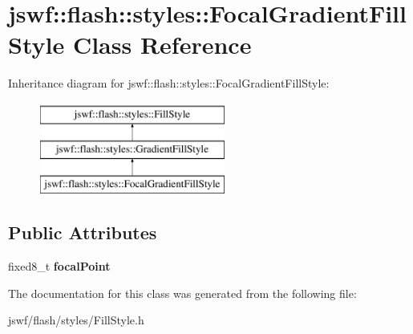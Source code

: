 \hypertarget{classjswf_1_1flash_1_1styles_1_1_focal_gradient_fill_style}{\section{jswf\+:\+:flash\+:\+:styles\+:\+:Focal\+Gradient\+Fill\+Style Class Reference}
\label{classjswf_1_1flash_1_1styles_1_1_focal_gradient_fill_style}
}
Inheritance diagram for jswf\+:\+:flash\+:\+:styles\+:\+:Focal\+Gradient\+Fill\+Style\+:\begin{figure}[H]
\begin{center}
\leavevmode
\includegraphics[height=3.000000cm]{classjswf_1_1flash_1_1styles_1_1_focal_gradient_fill_style}
\end{center}
\end{figure}
\subsection*{Public Attributes}
\begin{DoxyCompactItemize}
\item 
\hypertarget{classjswf_1_1flash_1_1styles_1_1_focal_gradient_fill_style_a00a56dcfd5466dd9d21a22a5f69b7cc1}{fixed8\+\_\+t {\bfseries focal\+Point}}\label{classjswf_1_1flash_1_1styles_1_1_focal_gradient_fill_style_a00a56dcfd5466dd9d21a22a5f69b7cc1}

\end{DoxyCompactItemize}


The documentation for this class was generated from the following file\+:\begin{DoxyCompactItemize}
\item 
jswf/flash/styles/Fill\+Style.\+h\end{DoxyCompactItemize}
